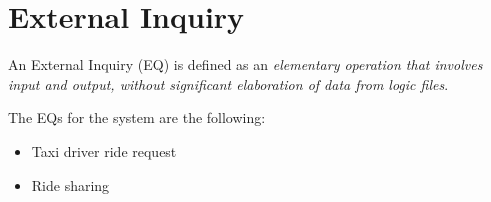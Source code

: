 \section{External Inquiry}
An External Inquiry (EQ) is defined as an \emph{elementary operation that involves input and output, without significant elaboration of data from logic files}.

The EQs for the system are the following:
\begin{itemize}
	\item Taxi driver ride request
	\item Ride sharing
\end{itemize}
